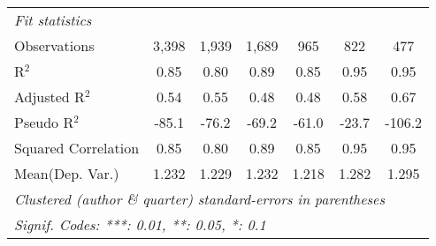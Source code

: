 \begin{tabular}{lcccccc}
   \midrule
   \emph{Fit statistics}\\
   Observations                                               & 3,398   & 1,939         & 1,689         & 965          & 822            & 477\\  
   R$^2$                                                      & 0.85    & 0.80          & 0.89          & 0.85         & 0.95           & 0.95\\  
   Adjusted R$^2$                                             & 0.54    & 0.55          & 0.48          & 0.48         & 0.58           & 0.67\\  
   Pseudo R$^2$                                               & -85.1   & -76.2         & -69.2         & -61.0        & -23.7          & -106.2\\  
   Squared Correlation                                        & 0.85    & 0.80          & 0.89          & 0.85         & 0.95           & 0.95\\  
Mean(Dep. Var.) & 1.232 & 1.229 & 1.232 & 1.218 & 1.282 & 1.295 \\
   \midrule \midrule
   \multicolumn{7}{l}{\emph{Clustered (author \& quarter) standard-errors in parentheses}}\\
   \multicolumn{7}{l}{\emph{Signif. Codes: ***: 0.01, **: 0.05, *: 0.1}}\\
\end{tabular}
\par\endgroup
